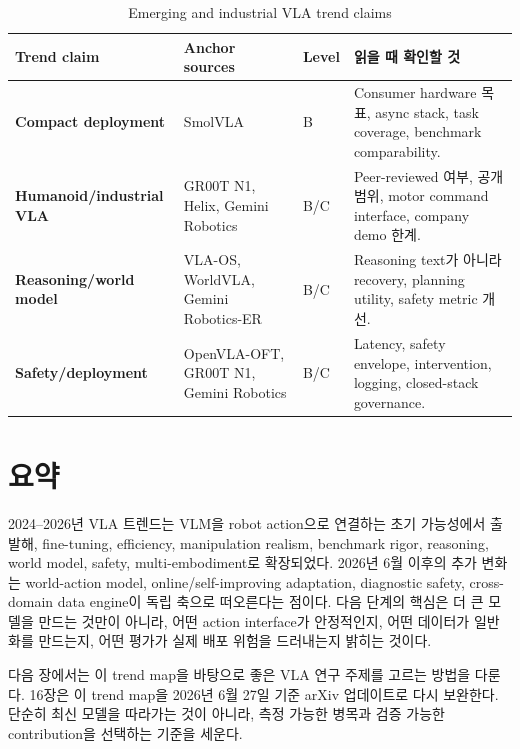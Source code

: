 \begin{table}[t]
  \centering
  \small
  \caption{Emerging and industrial VLA trend claims}
  \label{tab:claim_source_mapping_emerging}
  \begin{tabularx}{\textwidth}{>{\bfseries}p{34mm}p{38mm}p{14mm}X}
    \toprule
    Trend claim & Anchor sources & Level & 읽을 때 확인할 것 \\
    \midrule
    Compact deployment & SmolVLA & B & Consumer hardware 목표, async stack, task coverage, benchmark comparability. \\
    Humanoid/industrial VLA & GR00T N1, Helix, Gemini Robotics & B/C & Peer-reviewed 여부, 공개 범위, motor command interface, company demo 한계. \\
    Reasoning/world model & VLA-OS, WorldVLA, Gemini Robotics-ER & B/C & Reasoning text가 아니라 recovery, planning utility, safety metric 개선. \\
    Safety/deployment & OpenVLA-OFT, GR00T N1, Gemini Robotics & B/C & Latency, safety envelope, intervention, logging, closed-stack governance. \\
    \bottomrule
  \end{tabularx}
\end{table}

\section{요약}

2024--2026년 VLA 트렌드는 VLM을 robot action으로 연결하는 초기 가능성에서 출발해, fine-tuning, efficiency, manipulation realism, benchmark rigor, reasoning, world model, safety, multi-embodiment로 확장되었다. 2026년 6월 이후의 추가 변화는 world-action model, online/self-improving adaptation, diagnostic safety, cross-domain data engine이 독립 축으로 떠오른다는 점이다. 다음 단계의 핵심은 더 큰 모델을 만드는 것만이 아니라, 어떤 action interface가 안정적인지, 어떤 데이터가 일반화를 만드는지, 어떤 평가가 실제 배포 위험을 드러내는지 밝히는 것이다.

다음 장에서는 이 trend map을 바탕으로 좋은 VLA 연구 주제를 고르는 방법을 다룬다. 16장은 이 trend map을 2026년 6월 27일 기준 arXiv 업데이트로 다시 보완한다. 단순히 최신 모델을 따라가는 것이 아니라, 측정 가능한 병목과 검증 가능한 contribution을 선택하는 기준을 세운다.


